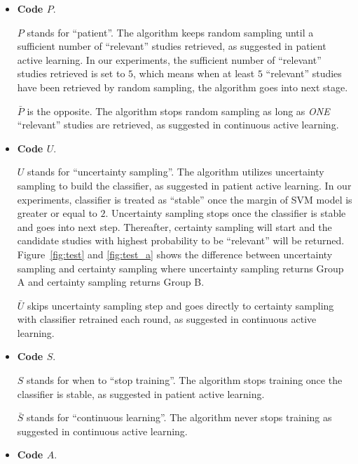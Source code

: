 \documentclass[final,twocolumn,5p]{elsarticle}
\theoremstyle{break}
\begin{document}
\begin{itemize}

\item
{\bf Code $P$}. 

\textbf{$P$} stands for ``patient''. The algorithm keeps random sampling until a sufficient number of ``relevant'' studies retrieved, as suggested in patient active learning. In our experiments, the sufficient number of ``relevant'' studies retrieved is set to $5$, which means when at least $5$ ``relevant'' studies have been retrieved by random sampling, the algorithm goes into next stage.

\textbf{$\bar{P}$} is the opposite. The algorithm stops random sampling as long as {\em ONE} ``relevant'' studies are retrieved, as suggested in continuous active learning.

\item
{\bf Code $U$}. 

\textbf{$U$} stands for ``uncertainty sampling''. The algorithm utilizes
uncertainty sampling to build the classifier, as suggested in patient active
learning. In our experiments, classifier is treated as ``stable'' once the margin
of SVM model is greater or equal to $2$. Uncertainty sampling stops once the
classifier is stable and goes into next step. Thereafter, certainty sampling
will start and the candidate studies with highest probability to be ``relevant''
will be returned. Figure~\ref{fig:test} and \ref{fig:test_a} shows the
difference between uncertainty sampling and certainty sampling where uncertainty
sampling returns Group A and certainty sampling returns Group B.

\textbf{$\bar{U}$} skips uncertainty sampling step and goes directly to certainty sampling with classifier retrained each round, as suggested in continuous active learning.

\item
{\bf Code $S$}. 

\textbf{$S$} stands for when to ``stop training''. The algorithm stops training
once the classifier is stable, as suggested in patient active learning.

\textbf{$\bar{S}$} stands for ``continuous learning''. The algorithm never stops
training as suggested in continuous active learning.

\item
{\bf Code $A$}. 


\end{itemize}
\end{document}
